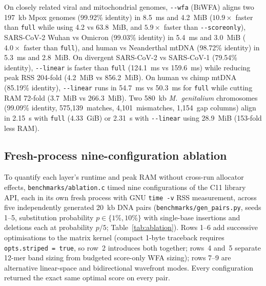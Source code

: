 \documentclass[11pt,a4paper]{article}
\begin{document}
On closely related viral and mitochondrial genomes, \texttt{-{}-wfa} (BiWFA) aligns two 197~kb Mpox genomes (99.92\% identity) in 8.5~ms and 4.2~MiB ($10.9\times$ faster than \texttt{full} while using 4.2 vs 63.8~MiB, and $5.9\times$ faster than \texttt{-{}-scoreonly}), SARS-CoV-2 Wuhan vs Omicron (99.03\% identity) in 5.4~ms and 3.0~MiB ($4.0\times$ faster than \texttt{full}), and human vs Neanderthal mtDNA (98.72\% identity) in 5.3~ms and 2.8~MiB. On divergent SARS-CoV-2 vs SARS-CoV-1 (79.54\% identity), \texttt{-{}-linear} is faster than \texttt{full} (124.1~ms vs 159.6~ms) while reducing peak RSS 204-fold (4.2~MiB vs 856.2~MiB). On human vs chimp mtDNA (85.19\% identity), \texttt{-{}-linear} runs in 54.7~ms vs 50.3~ms for \texttt{full} while cutting RAM 72-fold (3.7~MiB vs 266.3~MiB). Two 580~kb \textit{M.~genitalium} chromosomes (99.09\% identity, 575,139~matches, 4,101~mismatches, 1,154~gap columns) align in 2.15~s with \texttt{full} (4.33~GiB) or 2.31~s with \texttt{-{}-linear} using 28.9~MiB (153-fold less RAM).

\subsection{Fresh-process nine-configuration ablation}

To quantify each layer's runtime and peak RAM without cross-run allocator effects, \texttt{benchmarks/ablation.c} timed nine configurations of the C11 library API, each in its own fresh process with GNU \texttt{time -v} RSS measurement, across five independently generated 20~kb DNA pairs (\texttt{benchmarks/gen\_pairs.py}, seeds 1--5, substitution probability $p \in \{1\%, 10\%\}$ with single-base insertions and deletions each at probability $p/5$; Table~\ref{tab:ablation}). Rows 1--6 add successive optimisations to the matrix kernel (compact 1-byte traceback requires \texttt{opts.striped = true}, so row~2 introduces both together; rows~4 and~5 separate 12-mer band sizing from budgeted score-only WFA sizing); rows 7--9 are alternative linear-space and bidirectional wavefront modes. Every configuration returned the exact same optimal score on every pair.
\end{document}

